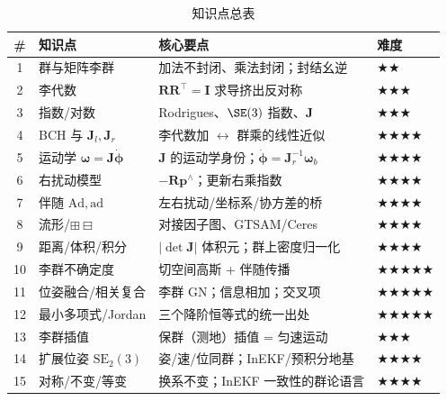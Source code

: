 \begin{table}[H]\centering\small
\caption{知识点总表}
\begin{tabular}{clll}
\toprule
\# & 知识点 & 核心要点 & 难度 \\
\midrule
1 & 群与矩阵李群 & 加法不封闭、乘法封闭；封结幺逆 & \(\bigstar\bigstar\) \\
2 & 李代数 & $\mathbf{R}\mathbf{R}^\top=\mathbf{I}$ 求导挤出反对称 & \(\bigstar\bigstar\bigstar\) \\
3 & 指数/对数 & Rodrigues、$\SE(3)$ 指数、$\mathbf{J}$ & \(\bigstar\bigstar\bigstar\) \\
4 & BCH 与 $\mathbf{J}_l,\mathbf{J}_r$ & 李代数加 $\leftrightarrow$ 群乘的线性近似 & \(\bigstar\bigstar\bigstar\bigstar\) \\
5 & 运动学 $\boldsymbol{\omega}=\mathbf{J}\dot{\boldsymbol{\phi}}$ & $\mathbf{J}$ 的运动学身份；$\dot{\boldsymbol{\phi}}=\mathbf{J}_r^{-1}\boldsymbol{\omega}_b$ & \(\bigstar\bigstar\bigstar\bigstar\) \\
6 & 右扰动模型 & $-\mathbf{R}\mathbf{p}^\wedge$；更新右乘指数 & \(\bigstar\bigstar\bigstar\bigstar\) \\
7 & 伴随 $\mathrm{Ad},\mathrm{ad}$ & 左右扰动/坐标系/协方差的桥 & \(\bigstar\bigstar\bigstar\bigstar\) \\
8 & 流形/$\boxplus\boxminus$ & 对接因子图、GTSAM/Ceres & \(\bigstar\bigstar\bigstar\bigstar\) \\
9 & 距离/体积/积分 & $|\det\mathbf{J}|$ 体积元；群上密度归一化 & \(\bigstar\bigstar\bigstar\bigstar\) \\
10 & 李群不确定度 & 切空间高斯 + 伴随传播 & \(\bigstar\bigstar\bigstar\bigstar\bigstar\) \\
11 & 位姿融合/相关复合 & 李群 GN；信息相加；交叉项 & \(\bigstar\bigstar\bigstar\bigstar\bigstar\) \\
12 & 最小多项式/Jordan & 三个降阶恒等式的统一出处 & \(\bigstar\bigstar\bigstar\bigstar\bigstar\) \\
13 & 李群插值 & 保群（测地）插值 = 匀速运动 & \(\bigstar\bigstar\bigstar\) \\
14 & 扩展位姿 $\mathrm{SE}_2(3)$ & 姿/速/位同群；InEKF/预积分地基 & \(\bigstar\bigstar\bigstar\bigstar\) \\
15 & 对称/不变/等变 & 换系不变；InEKF 一致性的群论语言 & \(\bigstar\bigstar\bigstar\bigstar\) \\
\bottomrule
\end{tabular}
\end{table}


